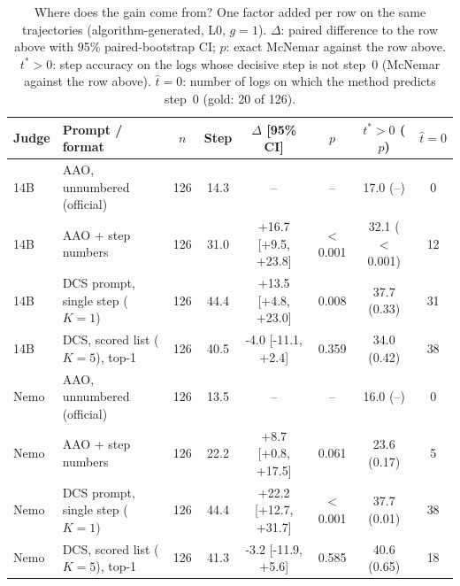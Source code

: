 \begin{table}[t]
\centering
\caption{Where does the gain come from? One factor added per row on the same trajectories (algorithm-generated, L0, $g{=}1$). $\Delta$: paired difference to the row above with 95\% paired-bootstrap CI; $p$: exact McNemar against the row above. $t^*{>}0$: step accuracy on the logs whose decisive step is not step~0 (McNemar against the row above). $\hat t{=}0$: number of logs on which the method predicts step~0 (gold: 20 of 126).}
\label{tab:decomp}
\footnotesize
\setlength{\tabcolsep}{2.5pt}
\begin{tabular}{@{}llcccccc@{}}
\toprule
Judge & Prompt / format & $n$ & Step & $\Delta$ [95\% CI] & $p$ & $t^*{>}0$ ($p$) & $\hat t{=}0$ \\
\midrule
14B & AAO, unnumbered (official) & 126 & 14.3 & -- & -- & 17.0 (--) & 0 \\
14B & AAO + step numbers & 126 & 31.0 & +16.7 [+9.5, +23.8] & $<$0.001 & 32.1 ($<$0.001) & 12 \\
14B & DCS prompt, single step ($K{=}1$) & 126 & 44.4 & +13.5 [+4.8, +23.0] & 0.008 & 37.7 (0.33) & 31 \\
14B & DCS, scored list ($K{=}5$), top-1 & 126 & 40.5 & -4.0 [-11.1, +2.4] & 0.359 & 34.0 (0.42) & 38 \\
\midrule
Nemo & AAO, unnumbered (official) & 126 & 13.5 & -- & -- & 16.0 (--) & 0 \\
Nemo & AAO + step numbers & 126 & 22.2 & +8.7 [+0.8, +17.5] & 0.061 & 23.6 (0.17) & 5 \\
Nemo & DCS prompt, single step ($K{=}1$) & 126 & 44.4 & +22.2 [+12.7, +31.7] & $<$0.001 & 37.7 (0.01) & 38 \\
Nemo & DCS, scored list ($K{=}5$), top-1 & 126 & 41.3 & -3.2 [-11.9, +5.6] & 0.585 & 40.6 (0.65) & 18 \\
\bottomrule
\end{tabular}
\end{table}